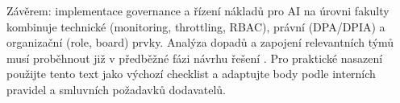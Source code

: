 \medskip

Závěrem: implementace governance a řízení nákladů pro AI na úrovni fakulty kombinuje technické (monitoring, throttling, RBAC), právní (DPA/DPIA) a organizační (role, board) prvky. Analýza dopadů a zapojení relevantních týmů musí proběhnout již v předběžné fázi návrhu řešení \cite{kb_malinka_chatgpt_ve_vyuce_dva_roky_pote_2024_pdf_90bc3aaf_page_12_1}. Pro praktické nasazení použijte tento text jako výchozí checklist a adaptujte body podle interních pravidel a smluvních požadavků dodavatelů. \cite{kb_ai_101_tipu_pdf_04e4a115_page_54_1}